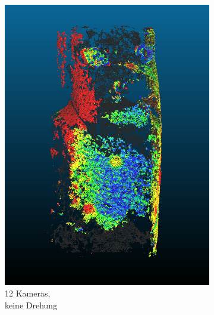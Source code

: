 \documentclass[./00PhotoBox.tex]{subfiles}
\begin{document}
\begin{figure}
\begin{subfigure}{0.24\textwidth}
        \includegraphics[width=1\linewidth]{img/cam_anzahl/second2.png}
        \centering
        \caption{12 Kameras,\\keine Drehung\\} %
        \label{img:moai_jede2K} %
    \end{subfigure}
    \begin{subfigure}{0.24\textwidth}

\end{subfigure}
\end{figure}
\end{document}

